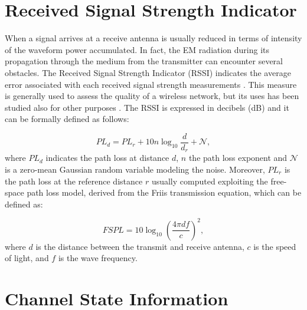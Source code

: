 \documentclass[binding=0.6cm,noexaminfo]{sapthesis}
\begin{document}
\section{Received Signal Strength Indicator}\label{sec:rssi}

When a signal arrives at a receive antenna is usually reduced in terms of intensity of the waveform power accumulated. In fact, the EM radiation during its propagation through the medium from the transmitter can encounter several obstacles. The Received Signal Strength Indicator (RSSI) indicates the average error associated with each received signal strength measurements \cite{rssi-def}. This measure is generally used to assess the quality of a wireless network, but its uses has been studied also for other purposes \cite{rssi-reliable}. The RSSI is expressed in decibels (dB) and it can be formally defined as follows:

\begin{equation}
PL_d = PL_{r} + 10 n \log_{10} \frac{d}{d_r} + \mathcal{N},
\end{equation}
where $PL_d$ indicates the path loss at distance $d$, $n$ the path loss exponent and $\mathcal{N}$ is a zero-mean Gaussian random variable modeling the noise. Moreover, $PL_{r}$ is the path loss at the reference distance $r$ usually computed exploiting the free-space path loss model, derived from the Friis transmission equation, which can be defined as:

\begin{equation}
FSPL = 10 \log_{10} \left( \frac{4 \pi d f}{c} \right)^2,
\end{equation}
where $d$ is the distance between the transmit and receive antenna, $c$ is the speed of light, and $f$ is the wave frequency.

\section{Channel State Information}\label{sec:csi}
\end{document}
